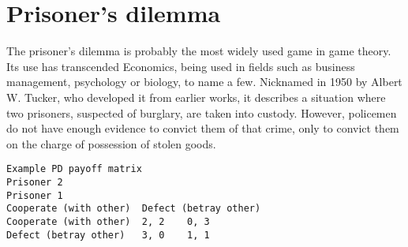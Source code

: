 \documentclass[]{report}
\begin{document}


\section{Prisoner’s dilemma}

The prisoner’s dilemma is probably the most widely used game in game theory. Its use has transcended Economics, being used in fields such as business management, psychology or biology, to name a few. Nicknamed in 1950 by Albert W. Tucker, who developed it from earlier works, it describes a situation where two prisoners, suspected of burglary, are taken into custody. However, policemen do not have enough evidence to convict them of that crime, only to convict them on the charge of possession of stolen goods.

\begin{verbatim}
Example PD payoff matrix
Prisoner 2
Prisoner 1
Cooperate (with other)	Defect (betray other)
Cooperate (with other)	2, 2	0, 3
Defect (betray other)	3, 0	1, 1
\end{verbatim}
\end{document}

